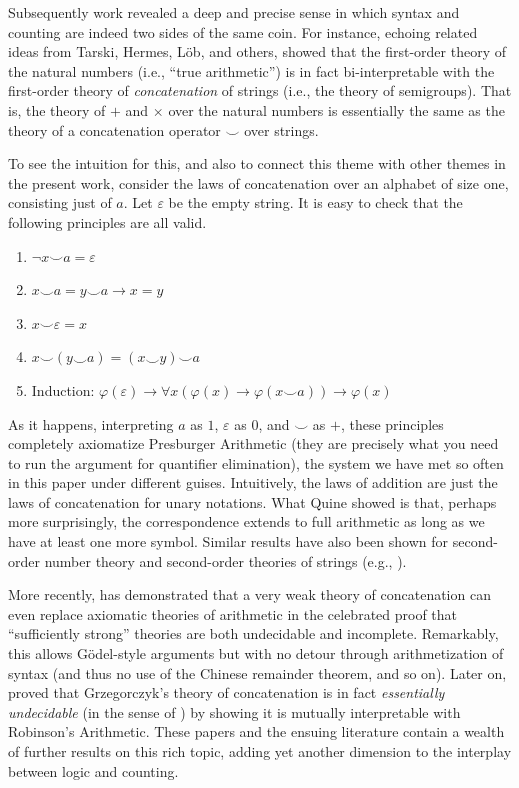 \documentclass[12pt,oneside,reqno]{amsart}
\theoremstyle{definition}
\begin{document}
Subsequently work revealed a deep and precise sense in which syntax and counting are indeed two sides of the same coin. For instance, echoing related ideas from Tarski, Hermes, L\"{o}b, and others, \cite{Quine} showed that the first-order theory of the natural numbers (i.e., ``true arithmetic'') is in fact bi-interpretable with the first-order theory of \emph{concatenation} of strings (i.e., the theory of semigroups). That is, the theory of $+$ and $\times$ over the natural numbers is essentially the same as the theory of a concatenation operator $\smile$ over strings. %

To see the intuition for this, and also to connect this theme with other themes in the present work, consider the laws of concatenation over an alphabet of size one, consisting just of $a$. Let $\varepsilon$ be the empty string. It is easy to check that the following principles are all valid. 
\begin{enumerate}
    \item $\neg x \smile a = \varepsilon$
    \item $x \smile a = y \smile a \rightarrow x=y$
    \item $x \smile \varepsilon = x$
    \item $x \smile (y \smile a) = (x \smile y) \smile a$
    \item Induction: $\varphi(\varepsilon) \rightarrow \forall x (\varphi(x) \rightarrow \varphi(x \smile a)) \rightarrow \varphi(x)$
\end{enumerate}\vspace{0.5ex}
As it happens, interpreting $a$ as $1$, $\varepsilon$ as $0$, and $\smile$ as $+$, these principles completely axiomatize Presburger Arithmetic (they are precisely what you need to run the argument for quantifier elimination), the system we have met so often in this paper under different guises. Intuitively, the laws of addition are just the laws of concatenation for unary notations. What Quine showed is that, perhaps more surprisingly, the correspondence extends to full arithmetic as long as we have at least one more symbol. Similar results have also been shown for second-order number theory and second-order theories of strings (e.g., \citealt{Corcoran}).


More recently, \cite{Grz} has demonstrated that a very weak theory of concatenation can even replace axiomatic theories of arithmetic in the celebrated proof that  ``sufficiently strong'' theories are both undecidable and incomplete. Remarkably, this allows G\"{o}del-style arguments but with no detour through arithmetization of syntax (and thus no use of the Chinese remainder theorem, and so on). 
Later on, \cite{Visser} proved that Grzegorczyk's theory of concatenation is in fact \emph{essentially undecidable} (in the sense of \citealt{Tarski}) by showing it is mutually interpretable with Robinson's Arithmetic. These papers and the ensuing literature contain a wealth of further results on this rich topic, adding yet another dimension to the  interplay between logic and counting. 
\end{document}
